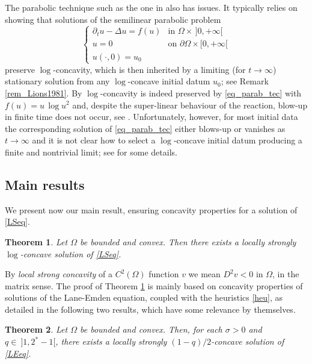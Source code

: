 \documentclass[12pt]{amsart}
\numberwithin{equation}{section}
\newtheorem{theorem}{Theorem}[section]
\theoremstyle{plain}
\theoremstyle{plain}
\theoremstyle{plain}
\theoremstyle{definition}
\begin{document}
The parabolic technique such as the one in \cite{Lio81} also has issues. It typically relies on showing that solutions of the semilinear parabolic problem
\begin{equation}\label{eq_parab_tec}
\begin{cases}
\partial_t u - \Delta u = f(u) &\text{in $\Omega\times\, ]0, +\infty[$}\\
u= 0 &\text{on $\partial\Omega\times [0, +\infty[$}\\
u(\cdot , 0)=u_0
\end{cases} 
\end{equation}
preserve $\log$-concavity, which is then inherited by a limiting (for $t\to \infty$) stationary solution from any $\log$-concave initial datum $u_0$; see Remark \ref{rem_Lions1981}. 
By \cite{GrKa99, IST24} $\log$-concavity is indeed preserved by \eqref{eq_parab_tec} with $f(u)=u\, \log u^2$ and, despite the super-linear behaviour of the reaction, blow-up in finite time does not occur, see \cite[Proof of (4.4)]{CLL15}. 
Unfortunately, however, for most initial data the corresponding solution of \eqref{eq_parab_tec} either blows-up or vanishes as $t\to \infty$ and it is not clear how to select a $\log$-concave initial datum producing a finite and nontrivial limit; see \cite[Remark 4.6]{GMS25} for some details. 


 \subsection{Main results}

We present now our main result, ensuring concavity properties for a solution of \eqref{LSeq}.

\begin{theorem}\label{thm_main_log}
Let $\Omega$ be bounded and convex. Then there exists a locally strongly $\log$-concave solution of \eqref{LSeq}.
\end{theorem}

By \emph{local strong concavity} of a $C^2(\Omega)$ function $v$ we mean $D^2 v<0$ in $\Omega$, in the matrix sense.
The proof of Theorem \ref{thm_main_log} is mainly based on concavity properties of solutions of the Lane-Emden equation, coupled with the heuristics \eqref{heu}, as detailed in the following two results, which have some relevance by themselves.
 
 \begin{theorem}
\label{thm_main_power}
Let $\Omega$ be bounded and convex. Then, for each $\sigma>0$ and $q\in \ ]1, 2^*-1[$, there exists a locally strongly $(1-q)/2$-concave solution of \eqref{LEeq}.
\end{theorem}
\end{document}
